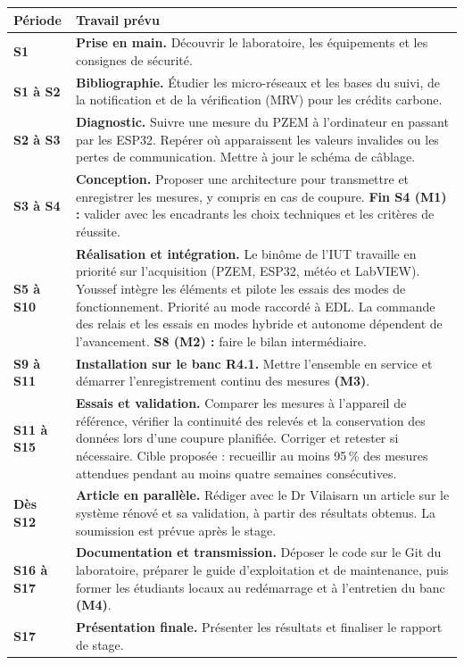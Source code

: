 \documentclass[11pt,a4paper]{article}
\newcommand{\periode}[1]{\textcolor{rougeCV}{\textbf{#1}}}
\newcommand{\phase}[1]{\textcolor{rougeCV}{\textbf{#1}}}
\begin{document}
\begin{tabularx}{\linewidth}{@{}p{27mm}>{\raggedright\arraybackslash}X@{}}
\toprule
\phase{Période} & \phase{Travail prévu} \\ \midrule
\periode{S1} & \phase{Prise en main.} Découvrir le laboratoire, les équipements et les consignes de sécurité. \\[2.4mm]
\periode{S1 à S2} & \phase{Bibliographie.} Étudier les micro-réseaux et les bases du suivi, de la notification et de la vérification (MRV) pour les crédits carbone. \\[2.4mm]
\periode{S2 à S3} & \phase{Diagnostic.} Suivre une mesure du PZEM à l'ordinateur en passant par les ESP32. Repérer où apparaissent les valeurs invalides ou les pertes de communication. Mettre à jour le schéma de câblage. \\[2.4mm]
\periode{S3 à S4} & \phase{Conception.} Proposer une architecture pour transmettre et enregistrer les mesures, y compris en cas de coupure. \textbf{Fin S4 (M1) :} valider avec les encadrants les choix techniques et les critères de réussite. \\[2.4mm]
\periode{S5 à S10} & \phase{Réalisation et intégration.} Le binôme de l'IUT travaille en priorité sur l'acquisition (PZEM, ESP32, météo et LabVIEW). Youssef intègre les éléments et pilote les essais des modes de fonctionnement. Priorité au mode raccordé à EDL. La commande des relais et les essais en modes hybride et autonome dépendent de l'avancement. \textbf{S8 (M2) :} faire le bilan intermédiaire. \\[2.4mm]
\periode{S9 à S11} & \phase{Installation sur le banc R4.1.} Mettre l'ensemble en service et démarrer l'enregistrement continu des mesures \textbf{(M3)}. \\[2.4mm]
\periode{S11 à S15} & \phase{Essais et validation.} Comparer les mesures à l'appareil de référence, vérifier la continuité des relevés et la conservation des données lors d'une coupure planifiée. Corriger et retester si nécessaire. Cible proposée : recueillir au moins 95\,\% des mesures attendues pendant au moins quatre semaines consécutives. \\[2.4mm]
\periode{Dès S12} & \phase{Article en parallèle.} Rédiger avec le Dr Vilaisarn un article sur le système rénové et sa validation, à partir des résultats obtenus. La soumission est prévue après le stage. \\[2.4mm]
\periode{S16 à S17} & \phase{Documentation et transmission.} Déposer le code sur le Git du laboratoire, préparer le guide d'exploitation et de maintenance, puis former les étudiants locaux au redémarrage et à l'entretien du banc \textbf{(M4)}. \\[2.4mm]
\periode{S17} & \phase{Présentation finale.} Présenter les résultats et finaliser le rapport de stage. \\
\bottomrule
\end{tabularx}
\end{document}
